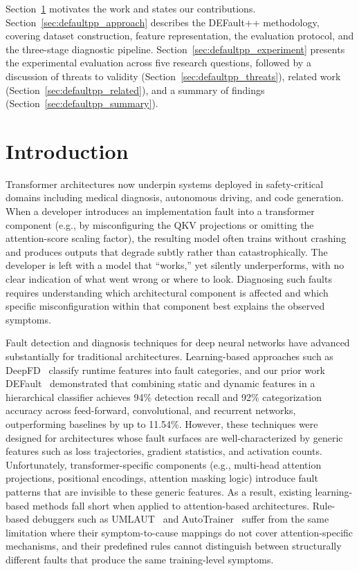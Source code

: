 Section~\ref{sec:defaultpp_introduction} motivates the work and states our contributions.
Section~\ref{sec:defaultpp_approach} describes the DEFault++ methodology, covering dataset construction, feature representation, the evaluation protocol, and the three-stage diagnostic pipeline.
Section~\ref{sec:defaultpp_experiment} presents the experimental evaluation across five research questions, followed by a discussion of threats to validity (Section~\ref{sec:defaultpp_threats}), related work (Section~\ref{sec:defaultpp_related}), and a summary of findings (Section~\ref{sec:defaultpp_summary}).

\section{Introduction}
\label{sec:defaultpp_introduction}

Transformer architectures now underpin systems deployed in safety-critical domains including medical diagnosis, autonomous driving, and code generation. When a developer introduces an implementation fault into a transformer component (e.g., by misconfiguring the QKV projections or omitting the attention-score scaling factor), the resulting model often trains without crashing and produces outputs that degrade subtly rather than catastrophically. The developer is left with a model that ``works,'' yet silently underperforms, with no clear indication of what went wrong or where to look. Diagnosing such faults requires understanding which architectural component is affected and which specific misconfiguration within that component best explains the observed symptoms.

Fault detection and diagnosis techniques for deep neural networks have advanced substantially for traditional architectures. Learning-based approaches such as DeepFD~\cite{deepfd} classify runtime features into fault categories, and our prior work DEFault~\cite{default} demonstrated that combining static and dynamic features in a hierarchical classifier achieves 94\% detection recall and 92\% categorization accuracy across feed-forward, convolutional, and recurrent networks, outperforming baselines by up to 11.54\%. However, these techniques were designed for architectures whose fault surfaces are well-characterized by generic features such as loss trajectories, gradient statistics, and activation counts. Unfortunately, transformer-specific components (e.g., multi-head attention projections, positional encodings, attention masking logic) introduce fault patterns that are invisible to these generic features. As a result, existing learning-based methods fall short when applied to attention-based architectures. Rule-based debuggers such as UMLAUT~\cite{umlaut} and AutoTrainer~\cite{autotrainer} suffer from the same limitation where their symptom-to-cause mappings do not cover attention-specific mechanisms, and their predefined rules cannot distinguish between structurally different faults that produce the same training-level symptoms.

